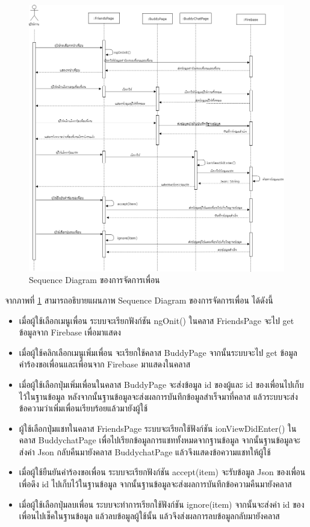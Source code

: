 	\begin{figure}[H]
		\centering
		\includegraphics[width=1.0\columnwidth]
		{Figures/3/Sequence/friend}
		\caption{Sequence Diagram ของการจัดการเพื่อน}
		\label{Fig:Sequence-friend}
	\end{figure}
	\newpage
	จากภาพที่ \ref{Fig:Sequence-friend} สามารถอธิบายแผนภาพ Sequence Diagram ของการจัดการเพื่อน ได้ดังนี้ 
	\begin{itemize}
		\item เมื่อผู้ใช้เลือกเมนูเพื่อน ระบบจะเรียกฟังก์ชัน ngOnit() ในคลาส FriendsPage จะไป get ข้อมูลจาก Firebase เพื่อมาแสดง
		\item เมื่อผู้ใช้คลิกเลือกเมนูเพิ่มเพื่อน จะเรียกใช้คลาส BuddyPage จากนั้นระบบจะไป get ข้อมูลคำร้องขอเพื่อนและเพื่อนจาก Firebase มาแสดงในคลาส 
		\item เมื่อผู้ใช้เลือกปุ่มเพิ่มเพื่อนในคลาส BuddyPage จะส่งข้อมูล id ของผู้และ id ของเพื่อนไปเก็บไว้ในฐานข้อมูล หลังจากนั้นฐานข้อมูลจะส่งผลการบันทึกข้อมูลสำเร็จมาที่คลาส แล้วระบบจะส่งข้อความว่าเพิ่มเพื่อนเรียบร้อยแล้วมายังผู้ใช้
		\item ผู้ใช้เลือกปุ่มแชทในคลาส FriendsPage ระบบจะเรียกใช้ฟังก์ชัน ionViewDidEnter() ในคลาส BuddychatPage เพื่อไปเรียกข้อมูลการแชททั้งหมดจากฐานข้อมูล จากนั้นฐานข้อมูลจะส่งค่า Json กลับคืนมายังคลาส BuddychatPage แล้วจึงแสดงข้อความแชทให้ผู้ใช้
		\item เมื่อผู้ใช้ยืนยันคำร้องขอเพื่อน ระบบจะเรียกฟังก์ชัน accept(item) จะรับข้อมูล Json ของเพื่อนเพื่อดึง id ไปเก็บไว้ในฐานข้อมูล จากนั้นฐานข้อมูลจะส่งผลการบันทึกข้อความคืนมายังคลาส
		\item เมื่อผู้ใช้เลือกปุ่มลบเพื่อน ระบบจะทำการเรียกใช้ฟังก์ชัน ignore(item) จากนั้นจะส่งค่า id ของเพื่อนไปเช็คในฐานข้อมูล แล้วลบข้อมูลผู้ใช้นั้น แล้วจึงส่งผลการลบข้อมูลกลับมายังคลาส
		\end{itemize}
\newpage	 


